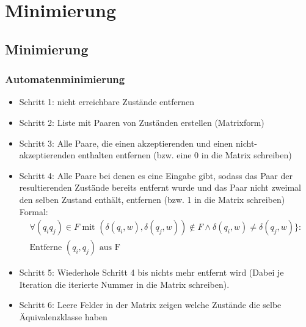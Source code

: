 \section{Minimierung}
\subsection{Minimierung}

\begin{frame}
\frametitle{Automatenminimierung}
\begin{itemize}
	\item Schritt 1: nicht erreichbare Zustände entfernen
	\item Schritt 2: Liste mit Paaren von Zuständen erstellen (Matrixform)
	\item Schritt 3: Alle Paare, die einen akzeptierenden und einen nicht-akzeptierenden enthalten entfernen (bzw. eine 0 in die Matrix schreiben)
	\item Schritt 4: Alle Paare bei denen es eine Eingabe gibt, sodass das Paar der resultierenden Zustände bereits entfernt wurde und das Paar nicht zweimal den selben Zustand enthält, entfernen (bzw. 1 in die Matrix schreiben) Formal:\vspace*{-0.25 cm}
	\begin{multline*}
	\forall (q_i q_j) \in F \text{ mit } (\delta(q_i, w), \delta(q_j, w)) \notin F \land \delta(q_i, w) \neq \delta(q_j, w)\}:\\
	\text{Entferne } (q_i, q_j) \text{ aus F}
	\end{multline*}
	\item Schritt 5: Wiederhole Schritt 4 bis nichts mehr entfernt wird (Dabei je Iteration die iterierte Nummer in die Matrix schreiben).
	\item Schritt 6: Leere Felder in der Matrix zeigen welche Zustände die selbe Äquivalenzklasse haben
\end{itemize}
\end{frame}

